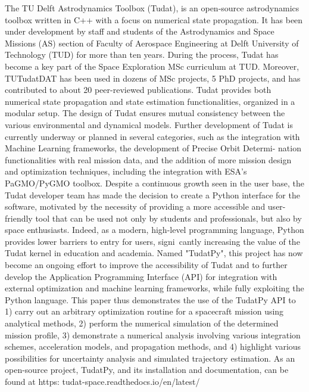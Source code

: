 The TU Delft Astrodynamics Toolbox (Tudat), is an open-source astrodynamics toolbox written in C++ with a focus on numerical state propagation. It has been under development by staff and students of the Astrodynamics and Space Missions (AS) section of Faculty of Aerospace Engineering at Delft University of Technology (TUD) for more than ten years. During the process, Tudat has become a key part of the Space Exploration MSc curriculum at TUD. Moreover, TUTudatDAT has been used in dozens of MSc projects, 5 PhD projects, and has contributed to about 20 peer-reviewed publications.    Tudat provides both numerical state propagation and state estimation functionalities, organized in a modular setup. The design of Tudat ensures mutual consistency between the various environmental and dynamical models. Further development of Tudat is currently underway or planned in several categories, such as the integration with Machine Learning frameworks, the development of Precise Orbit Determi- nation functionalities with real mission data, and the addition of more mission design and optimization techniques, including the integration with ESA's PaGMO/PyGMO toolbox.    Despite a continuous growth seen in the user base, the Tudat developer team has made the decision to create a Python interface for the software, motivated by the necessity of providing a more accessible and user-friendly tool that can be used not only by students and professionals, but also by space enthusiasts.  Indeed, as a modern, high-level programming language, Python provides lower barriers to entry for users, signi cantly increasing the value of the Tudat kernel in education and academia.  Named "TudatPy", this project has now become an ongoing effort to improve the accessibility of Tudat and to further develop the Application Programming Interface (API) for integration with external optimization and machine learning frameworks, while fully exploiting the Python language.  This paper thus demonstrates the use of the TudatPy API to 1) carry out an arbitrary optimization routine for a spacecraft mission using analytical methods, 2) perform the numerical simulation of the determined mission profile, 3) demonstrate a numerical analysis involving various integration schemes, acceleration models, and propagation methods, and 4) highlight various possibilities for uncertainty analysis and simulated trajectory estimation.    As an open-source project, TudatPy, and its installation and documentation, can be found at https: tudat-space.readthedocs.io/en/latest/ 
